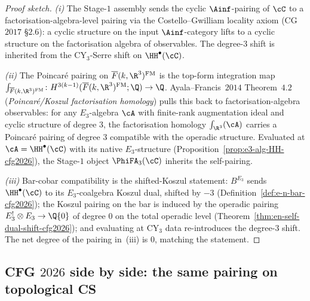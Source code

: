 \begin{proof}[Proof sketch]
\emph{(i)} The Stage-$1$ assembly sends the cyclic
$\Ainf$-pairing of $\cC$ to a factorisation-algebra-level pairing via
the Costello--Gwilliam locality axiom (CG~$2017$ \S$2.6$): a cyclic
structure on the input $\Ainf$-category lifts to a cyclic structure on
the factorisation algebra of observables. The degree-$3$ shift is
inherited from the CY$_3$-Serre shift on $\HH^\bullet(\cC)$.

\emph{(ii)} The Poincar\'e pairing on $\overline{F}(k, \R^3)^{\mathrm{FM}}$
is the top-form integration map
$\int_{\overline{F}(k, \R^3)^{\mathrm{FM}}} \colon H^{3(k-1)}(\overline{F}(k, \R^3)^{\mathrm{FM}}; \Q) \to \Q$.
Ayala--Francis~$2014$ Theorem~$4.2$ (\emph{Poincar\'e/Koszul
factorisation homology}) pulls this back to factorisation-algebra
observables: for any $E_3$-algebra $\cA$ with finite-rank augmentation
ideal and cyclic structure of degree $3$, the factorisation homology
$\int_{\R^3}(\cA)$ carries a Poincar\'e pairing of degree $3$ compatible
with the operadic structure. Evaluated at $\cA = \HH^\bullet(\cC)$
with its native $E_3$-structure
(Proposition~\textup{\ref{prop:e3-alg-HH-cfg2026}}), the Stage-$1$
object $\PhiFA_3(\cC)$ inherits the self-pairing.

\emph{(iii)} Bar-cobar compatibility is the shifted-Koszul statement:
$B^{E_3}$ sends $\HH^\bullet(\cC)$ to its $E_3$-coalgebra Koszul dual,
shifted by $-3$ (Definition~\textup{\ref{def:e-n-bar-cfg2026}}); the
Koszul pairing on the bar is induced by the operadic pairing
$E_3^! \otimes E_3 \to \Q\{0\}$ of degree $0$ on the total operadic
level (Theorem~\textup{\ref{thm:en-self-dual-shift-cfg2026}}); and
evaluating at CY$_3$ data re-introduces the degree-$3$ shift. The net
degree of the pairing in~(iii) is $0$, matching the statement.
\end{proof}

\subsection*{CFG $2026$ side by side: the same pairing on topological CS}

